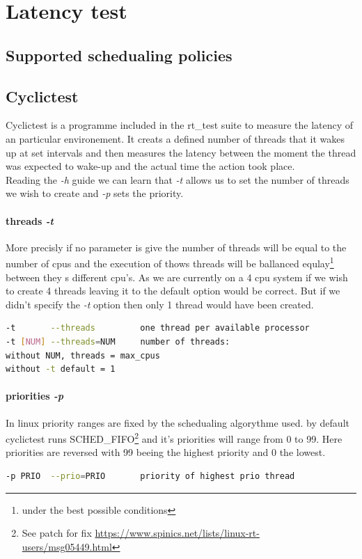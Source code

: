 \documentclass[10pt,a4paper]{article}
\begin{document}
\tableofcontents

\thispagestyle{empty}


\newpage
\section{Latency test}
\subsection{Supported schedualing policies}
\subsection{Cyclictest}
Cyclictest is a programme included in the rt\_test suite to measure the latency of an particular environement. It creats a defined number of threads that it wakes up at set intervals and then measures the latency between the moment the thread was expected to wake-up and the actual time the action took place.\\
Reading the \emph{-h} guide we can learn that \emph{-t} allows us to set the number of threads we wish to create and \emph{-p} sets the priority. 
\paragraph{threads \emph{-t}}
More precisly if no parameter is give the number of threads will be equal to the number of cpus and the execution of thows threads will be ballanced equlay\footnote{under the best possible conditions} between they s different cpu's. As we are currently on a 4 cpu system if we wish to create 4 threads leaving it to the default option would be correct. But if we didn't specify the \emph{-t} option then only 1 thread would have been created.
\begin{lstlisting}[language=bash,caption={cyclictest -h}]
-t       --threads         one thread per available processor
-t [NUM] --threads=NUM     number of threads:
without NUM, threads = max_cpus
without -t default = 1
\end{lstlisting}
\paragraph{priorities \emph{-p}}
In linux priority ranges are fixed by the schedualing algorythme used. by default cyclictest runs SCHED\_FIFO\footnote{See patch for fix \url{https://www.spinics.net/lists/linux-rt-users/msg05449.html}} and it's priorities will range from 0 to 99. Here priorities are reversed with 99 beeing the highest priority and 0 the lowest.
\begin{lstlisting}[language=bash,caption={cyclictest -h}]
-p PRIO  --prio=PRIO       priority of highest prio thread
\end{lstlisting}
\end{document}
